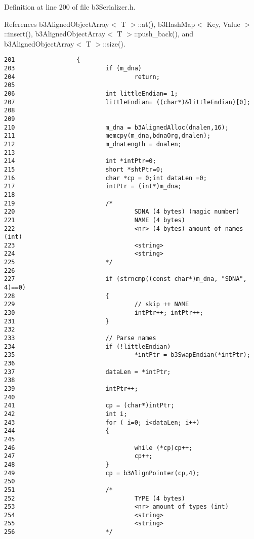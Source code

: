 Definition at line 200 of file b3Serializer.h.

References b3AlignedObjectArray$<$ T $>$::at(), b3HashMap$<$ Key, Value $>$::insert(), b3AlignedObjectArray$<$ T $>$::push\_\-back(), and b3AlignedObjectArray$<$ T $>$::size().

\begin{Code}\begin{verbatim}201                 {
203                         if (m_dna)
204                                 return;
205 
206                         int littleEndian= 1;
207                         littleEndian= ((char*)&littleEndian)[0];
208                         
209 
210                         m_dna = b3AlignedAlloc(dnalen,16);
211                         memcpy(m_dna,bdnaOrg,dnalen);
212                         m_dnaLength = dnalen;
213 
214                         int *intPtr=0;
215                         short *shtPtr=0;
216                         char *cp = 0;int dataLen =0;
217                         intPtr = (int*)m_dna;
218 
219                         /*
220                                 SDNA (4 bytes) (magic number)
221                                 NAME (4 bytes)
222                                 <nr> (4 bytes) amount of names (int)
223                                 <string>
224                                 <string>
225                         */
226 
227                         if (strncmp((const char*)m_dna, "SDNA", 4)==0)
228                         {
229                                 // skip ++ NAME
230                                 intPtr++; intPtr++;
231                         }
232 
233                         // Parse names
234                         if (!littleEndian)
235                                 *intPtr = b3SwapEndian(*intPtr);
236                                 
237                         dataLen = *intPtr;
238                         
239                         intPtr++;
240 
241                         cp = (char*)intPtr;
242                         int i;
243                         for ( i=0; i<dataLen; i++)
244                         {
245                                 
246                                 while (*cp)cp++;
247                                 cp++;
248                         }
249                         cp = b3AlignPointer(cp,4);
250 
251                         /*
252                                 TYPE (4 bytes)
253                                 <nr> amount of types (int)
254                                 <string>
255                                 <string>
256                         */

\end{verbatim}
\end{Code}
